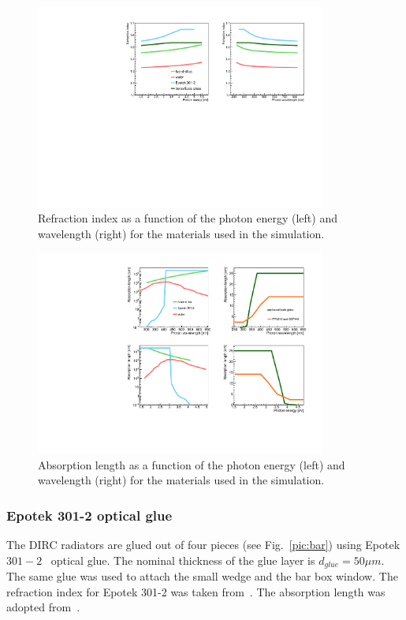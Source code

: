 \begin{figure}[!h]
\centering
\includegraphics[angle=0,width=0.85\textwidth]{pics/refind1.pdf}
\caption{\label{pic:mat1}
Refraction index as a function of the photon energy (left) and wavelength (right) for the materials used in the simulation.
}
\end{figure}

\begin{figure}[!h]
\centering
\includegraphics[angle=0,width=0.85\textwidth]{pics/ablen1.pdf}
\caption{\label{pic:mat2}
Absorption length as a function of the photon energy (left) and wavelength (right) for the materials used in the simulation.
}
\end{figure}

\subsubsection*{Epotek 301-2 optical glue}

The \babar DIRC radiators are glued out of four pieces (see Fig.~\ref{pic:bar}) using Epotek $301-2$~\cite{Epotek} optical glue. The nominal thickness of the glue layer is $d_{glue} = 50 \mu m$. The same glue was used to attach the small wedge and the bar box window. The refraction index for Epotek 301-2 was taken from~\cite{EpotekData}. The absorption length was adopted from~\cite{EpotekData}.

